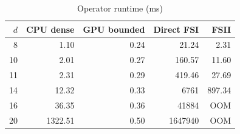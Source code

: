 \begin{table}[htbp]
\centering
\caption{Operator runtime (ms)}
\begin{tabular}{rrrrr}
\toprule
\(d\) & CPU dense & GPU bounded & Direct FSI & FSII \\
\midrule
8 & 1.10 & 0.24 & 21.24 & 2.31 \\
10 & 2.01 & 0.27 & 160.57 & 11.60 \\
11 & 2.31 & 0.29 & 419.46 & 27.69 \\
14 & 12.32 & 0.33 & 6761 & 897.34 \\
16 & 36.35 & 0.36 & 41884 & OOM \\
20 & 1322.51 & 0.50 & 1647940 & OOM \\
\bottomrule
\end{tabular}
\end{table}
